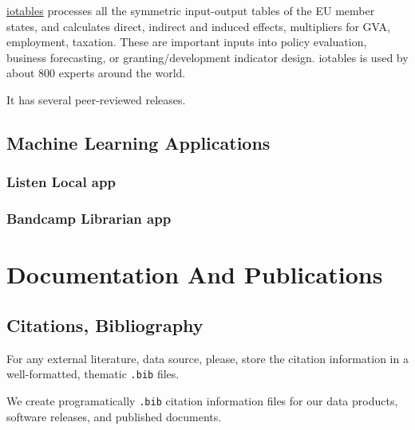 \documentclass[
  fontsize=13pt,
  english,
  a4paper,
  openany, a4paper, oneside]{article}
\begin{document}
\href{https://reprex.nl/software/iotables/}{iotables} processes all the symmetric input-output tables of the EU member states, and calculates direct, indirect and induced effects, multipliers for GVA, employment, taxation. These are important inputs into policy evaluation, business forecasting, or granting/development indicator design. iotables is used by about 800 experts around the world. \citep{R-iotables}

It has several peer-reviewed releases.

\hypertarget{machine-learning}{%
\subsection{Machine Learning Applications}\label{machine-learning}}

\hypertarget{listen-local-app}{%
\subsubsection{Listen Local app}\label{listen-local-app}}

\hypertarget{bandcamp-librarian-app}{%
\subsubsection{Bandcamp Librarian app}\label{bandcamp-librarian-app}}

\hypertarget{documentation}{%
\section{Documentation And Publications}\label{documentation}}

\hypertarget{citations-bibliography}{%
\subsection{Citations, Bibliography}\label{citations-bibliography}}

For any external literature, data source, please, store the citation information in a well-formatted, thematic \texttt{.bib} files.

We create programatically \texttt{.bib} citation information files for our data products, software releases, and published documents.
\end{document}
